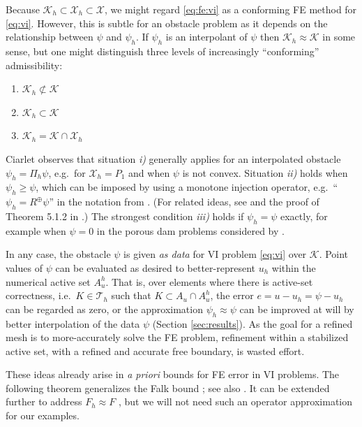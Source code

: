 \documentclass[]{interact}
\theoremstyle{plain}%
\theoremstyle{definition}
\theoremstyle{remark}
\newcommand{\cK}{\mathcal{K}}
\newcommand{\cT}{\mathcal{T}}
\newcommand{\cX}{\mathcal{X}}
\begin{document}
Because $\cK_h \subset \cX_h \subset \cX$, we might regard \eqref{eq:fe:vi} as a conforming FE method for \eqref{eq:vi}.  However, this is subtle for an obstacle problem as it depends on the relationship between $\psi$ and $\psi_h$.  If $\psi_h$ is an interpolant of $\psi$ then $\cK_h \approx \cK$ in some sense, but one might distinguish three levels of increasingly ``conforming'' admissibility:
\renewcommand{\labelenumi}{\emph{\roman{enumi})}}
\begin{enumerate}
\item $\cK_h \not \subset \cK$
\item $\cK_h \subset \cK$
\item $\cK_h = \cK \cap \cX_h$
\end{enumerate}
Ciarlet \cite[Figure 5.1.3]{Ciarlet2002} observes that situation \emph{i)} generally applies for an interpolated obstacle $\psi_h = \Pi_h \psi$, e.g.~for $\cX_h=P_1$ and when $\psi$ is not convex.  Situation \emph{ii)} holds when $\psi_h \ge \psi$, which can be imposed by using a monotone injection operator, e.g.~``$\psi_h = R^\oplus \psi$'' in the notation from \cite{BuelerFarrell2024}.  (For related ideas, see \cite{GraeserKornhuber2009} and the proof of Theorem 5.1.2 in \cite{Ciarlet2002}.)  The strongest condition \emph{iii)} holds if $\psi_h=\psi$ exactly, for example when $\psi=0$ in the porous dam problems considered by \cite{AinsworthOdenLee1993}.

In any case, the obstacle $\psi$ is given \emph{as data} for VI problem \eqref{eq:vi} over $\cK$.  Point values of $\psi$ can be evaluated as desired to better-represent $u_h$ within the numerical active set $A_u^h$.  That is, over elements where there is active-set correctness, i.e.~$K\in\cT_h$ such that $K \subset A_u \cap A_u^h$, the error $e=u-u_h=\psi-u_h$ can be regarded as zero, or the approximation $\psi_h \approx \psi$ can be improved at will by better interpolation of the data $\psi$ (Section \ref{sec:results}).  As the goal for a refined mesh is to more-accurately solve the FE problem, refinement within a stabilized active set, with a refined and accurate free boundary, is wasted effort.

These ideas already arise in \emph{a priori} bounds for FE error in VI problems.  The following theorem generalizes the Falk bound \cite{Falk1974}; see also \cite[Theorem 5.1.1]{Ciarlet2002}.  It can be extended further to address $F_h\approx F$ \cite[Theorem 6.3]{Bueler2024}, but we will not need such an operator approximation for our examples.
\end{document}
